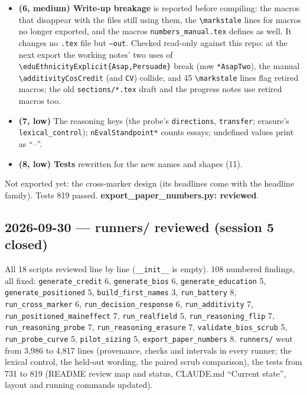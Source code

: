 \documentclass{article}
\begin{document}
\begin{itemize}
        skipped and listed, never read; the header lists every source with its code commit, dirty flag, model
        commit and data hashes, and warns on mixed commits.
  \item \textbf{(6, medium) Write-up breakage} is reported before compiling: the macros that disappear with the
        files still using them, the \texttt{\textbackslash markstale} lines for macros no longer exported, and the
        macros \texttt{numbers\_manual.tex} defines as well. It changes no \texttt{.tex} file but \texttt{--out}.
        Checked read-only against this repo: at the next export the working notes' two uses of
        \texttt{\textbackslash eduEthnicityExplicit\{Asap,Persuade\}} break (now \texttt{*AsapTwo}), the manual
        \texttt{\textbackslash additivityCosCredit} (and \texttt{CV}) collide, and 45 \texttt{\textbackslash markstale}
        lines flag retired macros; the old \texttt{sections/*.tex} draft and the progress notes use retired macros too.
  \item \textbf{(7, low)} The reasoning keys (the probe's \texttt{directions}, \texttt{transfer}; erasure's
        \texttt{lexical\_control}); \texttt{nEvalStandpoint*} counts essays; undefined values print as ``--''.
  \item \textbf{(8, low) Tests} rewritten for the new names and shapes (11).
\end{itemize}
Not exported yet: the cross-marker design (its headlines come with the headline family). Tests 819 passed.
\textbf{export\_paper\_numbers.py: reviewed}.

\subsection*{2026-09-30 --- runners/ reviewed (session 5 closed)}
All 18 scripts reviewed line by line (\texttt{\_\_init\_\_} is empty). 108 numbered findings, all fixed:
\texttt{generate\_credit} 6, \texttt{generate\_bios} 6, \texttt{generate\_education} 5, \texttt{generate\_positioned} 5,
\texttt{build\_first\_names} 3, \texttt{run\_battery} 8, \texttt{run\_cross\_marker} 6, \texttt{run\_decision\_response}
6, \texttt{run\_additivity} 7, \texttt{run\_positioned\_maineffect} 7, \texttt{run\_realfield} 5,
\texttt{run\_reasoning\_flip} 7, \texttt{run\_reasoning\_probe} 7, \texttt{run\_reasoning\_erasure} 7,
\texttt{validate\_bios\_scrub} 5, \texttt{run\_probe\_curve} 5, \texttt{pilot\_sizing} 5, \texttt{export\_paper\_numbers}
8. \texttt{runners/} went from 3{,}986 to 4{,}817 lines (provenance, checks and intervals in every runner; the
lexical control, the held-out wording, the paired scrub comparison), the tests from 731 to 819 (README review map
and status, CLAUDE.md ``Current state'', layout and running commands updated).
\end{document}
